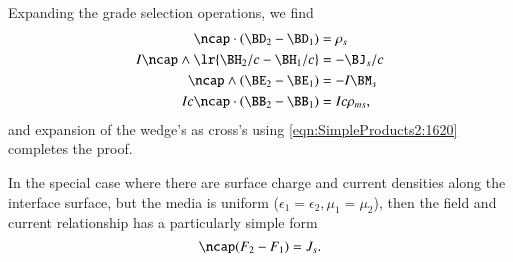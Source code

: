 Expanding the grade selection operations, we find
\begin{dmath}\label{eqn:boundarySurfaceSources:440}
\begin{aligned}
\ncap \cdot (\BD_2 - \BD_1) &= \rho_s \\
I \ncap \wedge \lr{ \BH_2/c - \BH_1/c } &= - \BJ_s/c \\
\ncap \wedge (\BE_2 - \BE_1) &= -I \BM_s \\
I c \ncap \cdot (\BB_2 - \BB_1) &= I c \rho_{ms},
\end{aligned}
\end{dmath}
and expansion of the wedge's as cross's using \cref{eqn:SimpleProducts2:1620} completes the proof.

In the special case where there are surface charge and current densities along the interface surface, but the media is uniform (\(\epsilon_1 = \epsilon_2, \mu_1 = \mu_2\)), then the field and current relationship has a particularly simple form \citep{chappell2014geometric}
\begin{dmath}\label{eqn:boundarySurfaceSources:421}
\ncap (F_2 - F_1) = J_s.
\end{dmath}


